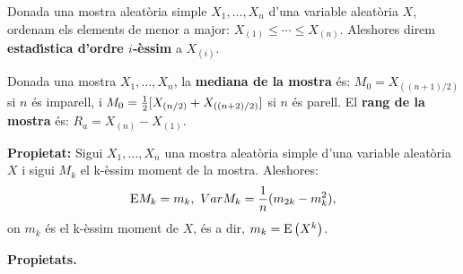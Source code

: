 \begin{defin}
Donada una mostra aleat\`oria simple $X_1, \ldots , X_n$ d'una variable
alea\-t\`o\-ria $X$, ordenam els elements de menor a major: 
$X_{(1)} \leq \cdots \leq X_{(n)}$. Aleshores direm 
{\bf estad\'{\i}stica d'ordre $i$-\`essim} a $X_{(i)}$.
\end{defin}

\begin{defin}
Donada una mostra $X_1, \ldots , X_n$, la {\bf mediana de la mostra}
 \'es:
$M_0 = X_{((n+1)/2)}$ si $n$ \'es imparell, i $M_0 = {1 \over 2} [X_{(n/2)} +
X_{((n+2)/2)}]$ si $n$ \'es parell.
El {\bf rang de la mostra} \'es: $R_a = X_{(n)} - X_{(1)}$.
\end{defin}

{\bf Propietat:} Sigui $X_1, \ldots , X_n$ una mostra aleat\`oria simple d'una
variable aleat\`oria $X$ i sigui $M_k$ el k-\`essim moment de la mostra.
 Aleshores:
$${\rm E}M_k = m_k, \ Var M_k = {1 \over n} (m_{2k} - m_k^2),$$
on $m_k$ \'es el k-\`essim moment de $X$, \'es a dir, 
$m_k ={\rm E} \left(X^k\right)$.

{\bf Propietats.}

